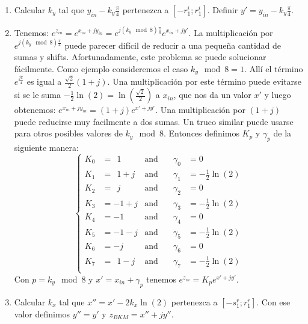 \documentclass[10pt,a4paper]{book}
\begin{document}
   \begin{enumerate}
      \item{Calcular $k_y$ tal que $y_{in} - k_y \frac{\pi}{4}$ pertenezca a $[-r_1^i; r_1^i]$. Definir $y'=y_{in} - k_y \frac{\pi}{4}$.}
      \item{Tenemos: $e^{z_{in}}=e^{x_{in}+jy_{in}}=e^{j(k_y \mod 8)\frac{\pi}{4}}e^{x_{in}+jy'}$. La multiplicación por $e^{j(k_y \mod 8)\frac{\pi}{4}}$ puede parecer difícil de reducir a una pequeña cantidad de sumas y shifts. Afortunadamente, este problema se puede solucionar fácilmente. Como ejemplo consideremos el caso $k_y \mod 8 = 1$. Allí el término $e^{\frac{j\pi}{4}}$ es igual a $\frac{\sqrt{2}}{2} (1+j)$. Una multiplicación por este término puede evitarse si se le suma
         $-\frac{1}{2}\ln(2)=\ln(\frac{\sqrt{2}}{2})$ a $x_{in}$, que nos da un valor $x'$ y luego obtenemos: $e^{x_{in}+jy_{in}} = (1+j)e^{x'+jy'}$. Una multiplicación por $(1+j)$ puede reducirse muy facilmente a dos sumas. Un truco similar puede usarse para otros posibles valores de $k_y\mod 8$. Entonces definimos $K_p$ y $\gamma_p$ de la siguiente manera:
         \begin{equation} \label{eq:E_range_ext_2}
            \left\{
               \begin{aligned}
                  K_0 &=\ \ 1    & \text{and} \quad & \gamma_0 &= 0                  \\
                  K_1 &=\ \ 1+j  & \text{and} \quad & \gamma_1 &= -\frac{1}{2}\ln(2) \\
                  K_2 &=\ \ j    & \text{and} \quad & \gamma_2 &= 0                  \\
                  K_3 &= -1+j    & \text{and} \quad & \gamma_3 &= -\frac{1}{2}\ln(2) \\
                  K_4 &= -1      & \text{and} \quad & \gamma_4 &= 0                  \\
                  K_5 &= -1-j    & \text{and} \quad & \gamma_5 &= -\frac{1}{2}\ln(2) \\
                  K_6 &= -j      & \text{and} \quad & \gamma_6 &= 0                  \\
                  K_7 &=\ \ 1-j  & \text{and} \quad & \gamma_7 &= -\frac{1}{2}\ln(2) \\
               \end{aligned}
            \right.
         \end{equation}
         Con $p= k_y \mod 8$ y $x'=x_{in}+\gamma_p$ tenemos $e^{z_{in}} = K_p e^{x'+jy'}$.
      }


   \item{Calcular $k_x$ tal que $x''=x'-2k_x\ln(2)$ pertenezca a $[-s_1^r; r_1^r]$. Con ese valor definimos $y''=y'$ y $z_{BKM} = x''+jy''$. }
   \end{enumerate}
\end{document}
